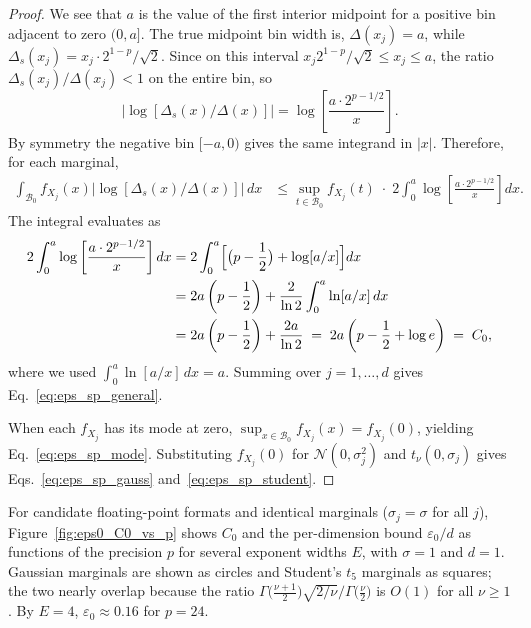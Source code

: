 \documentclass[12pt,onecolumn, margin=1in]{IEEEtran}
\newcommand{\bracket}[1]{\left[ #1 \right]}
\newcommand{\abs}[1]{\left| #1 \right|}
\begin{document}
\begin{proof}
We see that $a$ is the value of the first interior midpoint for a positive bin adjacent to zero $(0, a]$. The true midpoint bin width is,
$\Delta(x_j) = a$,
while $\Delta_s(x_j) = x_j \cdot 2^{1-p}/\sqrt{2}$.
Since on this interval $x_j 2^{1-p}/\sqrt{2} \leq x_j \leq a$, the ratio $\Delta_s(x_j)/\Delta(x_j) < 1$
on the entire bin, so
\begin{equation}
  \abs{\log\bracket{\Delta_s(x)/\Delta(x)}}
  = \log\bracket{\frac{a \cdot 2^{p-1/2}}{x}}.
\end{equation}
By symmetry the negative bin $[-a, 0)$ gives the same integrand in $|x|$.
Therefore, for each marginal,
\begin{align}
  \int_{\mathcal{B}_0} f_{X_j}(x)
    \bigl|\log\bracket{\Delta_s(x)/\Delta(x)}\bigr|\,dx
  &\leq
  \sup_{t \in \mathcal{B}_0} f_{X_j}(t)
  \;\cdot\;
  2\int_0^{a} \log\bracket{\frac{a\cdot 2^{p-1/2}}{x}}dx.
\end{align}
The integral evaluates as
\begin{align}
  2\int_0^{a} \log\bracket{\frac{a\cdot 2^{p-1/2}}{x}}dx
  &= 2\int_0^{a}\Bigl[\bigl(p - \frac{1}{2}\bigr)
     + \log[a/x]\Bigr]dx \notag\\
  &= 2a\left(p - \frac{1}{2}\right)
     + \frac{2}{\ln 2}\int_0^{a}\ln[a/x]\,dx \notag\\
  &= 2a\left(p - \frac{1}{2}\right) + \frac{2a}{\ln 2}
  \;=\; 2a\left(p - \frac{1}{2} + \log e\right)
  \;=\; C_0,
\end{align}
where we used $\int_0^{a}\ln[a/x]\,dx = a$.
Summing over $j=1,\dots,d$ gives Eq.~\eqref{eq:eps_sp_general}.

When each $f_{X_j}$ has its mode at zero,
$\sup_{x\in\mathcal{B}_0} f_{X_j}(x) = f_{X_j}(0)$,
yielding Eq.~\eqref{eq:eps_sp_mode}.
Substituting $f_{X_j}(0)$ for $\mathcal{N}(0,\sigma_j^2)$ and
$t_\nu(0,\sigma_j)$ gives Eqs.~\eqref{eq:eps_sp_gauss}
and~\eqref{eq:eps_sp_student}.
\end{proof}
 
For candidate floating-point formats and identical marginals
($\sigma_j = \sigma$ for all $j$), Figure~\ref{fig:eps0_C0_vs_p}
shows $C_0$ and the per-dimension bound $\varepsilon_{0}/d$
as functions of the precision $p$ for several exponent widths $E$,
with $\sigma = 1$ and $d = 1$.
Gaussian marginals are shown as circles and
Student's $t_5$ marginals as squares; the two nearly overlap because
the ratio
$\Gamma\bigl(\frac{\nu+1}{2}\bigr)\sqrt{2/\nu}\big/\Gamma\bigl(\frac{\nu}{2}\bigr)$
is $O(1)$ for all $\nu \ge 1$.
By $E = 4$, $\varepsilon_0 \approx 0.16$ for $p = 24$. 
\end{document}
